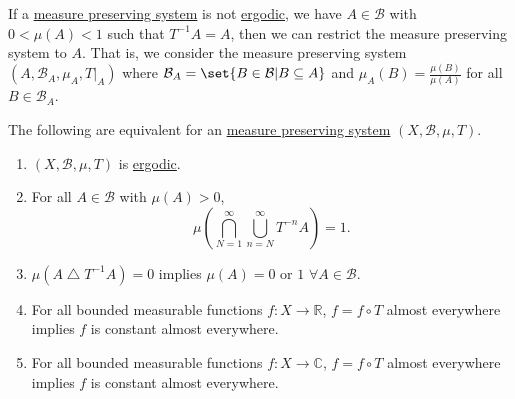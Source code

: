 \documentclass{article}
\newcommand{\sym}{\bigtriangleup}
\begin{document}
If a \hyperlink{def:mps}{measure preserving system} is not \hyperlink{def:ergodic}{ergodic}, we have $A \in \mathcal{B}$ with $0 < \mu(A) < 1$ such that $T^{-1} A = A$, then we can restrict the measure preserving system to $A$.
That is, we consider the measure preserving system $(A, \mathcal{B}_A, \mu_A, T|_A)$ where $\mathcal{B}_A = \set{B \in \mathcal{B} | B \subseteq A}$ and $\mu_A(B) = \frac{\mu(B)}{\mu(A)}$ for all $B \in \mathcal{B}_A$.
\begin{thm}
  The following are equivalent for an \hyperlink{def:mps}{measure preserving system} $(X, \mathcal{B}, \mu,T)$.
  \begin{enumerate}[label=(\arabic*)]
    \item $(X, \mathcal{B}, \mu, T)$ is \hyperlink{def:ergodic}{ergodic}.
    \item For all $A \in \mathcal{B}$ with $\mu(A) > 0$,
      \begin{equation*}
        \mu\left(\bigcap_{N=1}^\infty \bigcup_{n=N}^\infty T^{-n} A\right) = 1.
      \end{equation*}
    \item $\mu(A \sym T^{-1} A) = 0$ implies $\mu(A) = 0$ or $1$ $\forall A \in \mathcal{B}$.
    \item For all bounded measurable functions $f: X \to \mathbb{R}$,
      $f = f \circ T$ almost everywhere implies $f$ is constant almost everywhere.
    \item For all bounded measurable functions $f: X \to \mathbb{C}$,
      $f = f \circ T$ almost everywhere implies $f$ is constant almost everywhere.
  \end{enumerate}
\end{thm}
\end{document}
